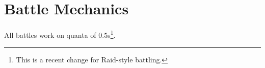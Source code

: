 \chapter{Battle Mechanics}
All battles work on quanta of 0.5s\footnote{This is a recent change for Raid-style battling.}.
